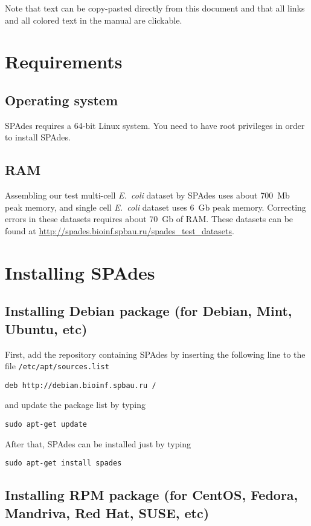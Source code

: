 \documentclass{article}
\def\spades{SPAdes}
\def\ecoli{\it E.~coli}
\begin{document}
Note that text can be copy-pasted directly from this document
and that all links and all colored text in the manual are clickable.


\section{Requirements}
\subsection{Operating system}
{\spades} requires a 64-bit Linux system.
You need to have root privileges in order to install {\spades}.

\subsection{RAM}
Assembling our test multi-cell {\ecoli} dataset 
by {\spades} uses about 700~Mb peak memory, and single cell
{\ecoli} dataset uses 6~Gb peak memory. 
Correcting errors in these datasets requires about 70~Gb of RAM.
These datasets can be found at \url{http://spades.bioinf.spbau.ru/spades_test_datasets}.

\section{Installing {\spades}}
\subsection{Installing Debian package (for Debian, Mint, Ubuntu, etc)}
First, add the repository containing {\spades} by inserting the following line
to the file {\tt /etc/apt/sources.list}
\begin{lstlisting}
deb http://debian.bioinf.spbau.ru /
\end{lstlisting}
and update the package list by typing
\begin{lstlisting}
sudo apt-get update
\end{lstlisting}
After that, {\spades} can be installed just by typing
\begin{lstlisting}
sudo apt-get install spades
\end{lstlisting}

\subsection{Installing RPM package (for CentOS, Fedora, Mandriva, Red Hat, SUSE, etc)}
\end{document}
